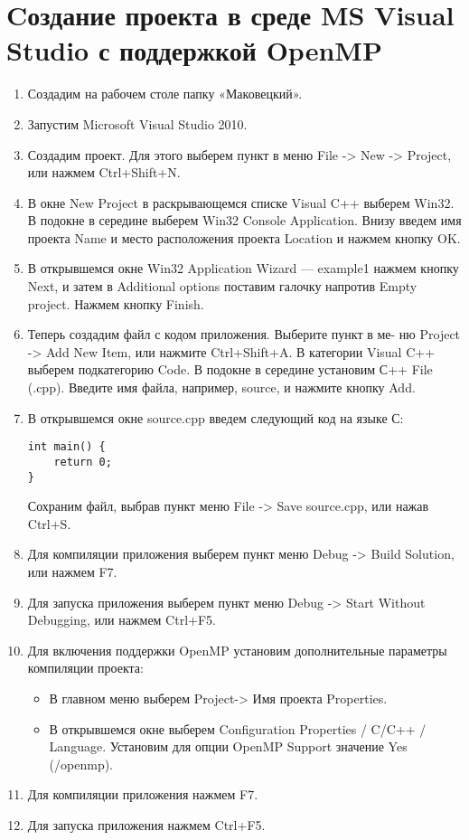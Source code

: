 \chapter{Cоздание проекта в среде MS Visual Studio с поддержкой OpenMP}

\begin{enumerate}
   \item Создадим на рабочем столе папку «Маковецкий».

    \item Запустим Microsoft Visual Studio 2010.

    \item Создадим проект. Для этого выберем пункт в меню File -> New -> Project, или нажмем Ctrl+Shift+N.

    \item В окне New Project в раскрывающемся списке Visual C++ выберем Win32. В подокне в середине выберем Win32 Console Application. Внизу введем имя проекта Name и место расположения проекта Location и нажмем кнопку OK.
    \item В открывшемся окне Win32 Application Wizard --- example1 нажмем кнопку Next, и затем в Additional options поставим галочку напротив Empty project. Нажмем кнопку Finish.
        \item Теперь создадим файл с кодом приложения. Выберите пункт в ме-
        ню Project
        -> Add New Item, или нажмите Ctrl+Shift+A. В категории Visual
        C++ выберем подкатегорию Code. В подокне в середине установим С++
        File (.cpp). Введите имя файла, например, source, и нажмите кнопку Add.
        \item В открывшемся окне source.cpp введем следующий код на языке С:
            \begin{lstlisting}
int main() {
    return 0;
}
            \end{lstlisting}
            Сохраним файл, выбрав пункт меню File -> Save source.cpp, или нажав Ctrl+S.
        \item Для компиляции приложения выберем пункт меню Debug -> Build Solution, или нажмем F7.
        \item Для запуска приложения выберем пункт меню Debug -> Start Without Debugging, или нажмем Ctrl+F5.
        \item Для включения поддержки OpenMP установим дополнительные параметры компиляции проекта:
            \begin{itemize}
            \item В главном меню выберем Project-> Имя проекта Properties.
            \item В открывшемся окне выберем Configuration Properties / C/C++ /
                Language. Установим для опции OpenMP Support значение Yes
                (/openmp).
            \end{itemize}
        \item Для компиляции приложения нажмем F7.
        \item Для запуска приложения нажмем Ctrl+F5.
\end{enumerate}

\FloatBarrier
